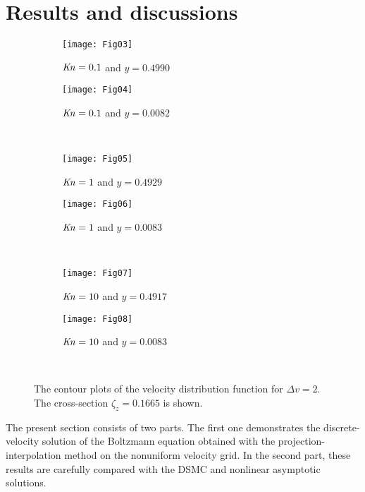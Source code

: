 \documentclass[review]{elsarticle}
\newcommand{\Kn}{\mbox{\textit{Kn}}}
\begin{document}
\section{Results and discussions}

\begin{figure}
    \centering
    \begin{subfigure}[b]{.5\linewidth}
        \texttt{[image: Fig03]}
        \caption{\(\Kn=0.1\) and \(y=0.4990\)}
        \label{fig:distrib-kn0.1:boundary}
    \end{subfigure}%
    \begin{subfigure}[b]{.5\linewidth}
        \texttt{[image: Fig04]}
        \caption{\(\Kn=0.1\) and \(y=0.0082\)}
        \label{fig:distrib-kn0.1:center}
    \end{subfigure}\\
    \begin{subfigure}[b]{.5\linewidth}
        \texttt{[image: Fig05]}
        \caption{\(\Kn=1\) and \(y=0.4929\)}
        \label{fig:distrib-kn1.0:boundary}
    \end{subfigure}%
    \begin{subfigure}[b]{.5\linewidth}
        \texttt{[image: Fig06]}
        \caption{\(\Kn=1\) and \(y=0.0083\)}
        \label{fig:distrib-kn1.0:center}
    \end{subfigure}\\
    \begin{subfigure}[b]{.5\linewidth}
        \texttt{[image: Fig07]}
        \caption{\(\Kn=10\) and \(y=0.4917\)}
        \label{fig:distrib-kn10:boundary}
    \end{subfigure}%
    \begin{subfigure}[b]{.5\linewidth}
        \texttt{[image: Fig08]}
        \caption{\(\Kn=10\) and \(y=0.0083\)}
        \label{fig:distrib-kn10:center}
    \end{subfigure}\\
    \caption{The contour plots of the velocity distribution function for \(\Delta{v}=2\).
        The cross-section \(\zeta_z=0.1665\) is shown.}
    \label{fig:distrib}
\end{figure}

The present section consists of two parts.
The first one demonstrates the discrete-velocity solution of the Boltzmann equation
obtained with the projection-interpolation method on the nonuniform velocity grid.
In the second part, these results are carefully compared with the DSMC and nonlinear asymptotic solutions.
\end{document}
